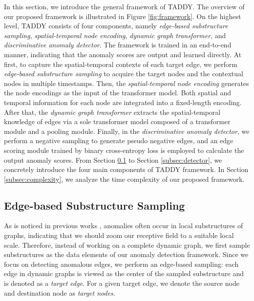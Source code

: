 \documentclass[10pt,journal,compsoc]{IEEEtran}
\newcommand{\HL}{}
\newcommand{\yg}{}
\begin{document}
In this section, we introduce the general framework of TADDY. The overview of our proposed framework is illustrated in Figure \ref{fig:framework}. On the highest level, TADDY consists of four components, namely \textit{edge-based substructure sampling}, \textit{spatial-temporal node encoding}, \textit{dynamic graph transformer}, and \textit{discriminative anomaly detector}. The framework \HL{is trained} in an end-to-end manner, \HL{indicating} that the anomaly scores are output and learned directly.
At first, to capture the spatial-temporal contexts of each target edge, we perform \textit{edge-based substructure sampling} to acquire the target nodes and the contextual nodes in multiple timestamps.
Then, the \textit{spatial-temporal node encoding} generates the node encodings as the input of the transformer model. Both spatial and temporal information for each node are integrated into a fixed-length encoding.
After that, the \textit{dynamic graph transformer} extracts the spatial-temporal knowledge of edges via a sole transformer model composed of a transformer module and a pooling module.
Finally, in the \textit{discriminative anomaly detector}, we perform a negative sampling to generate pseudo negative edges, and an edge scoring module trained by binary cross-entropy loss is employed to calculate the output anomaly scores.
From Section \ref{subsec:sampling} to Section \ref{subsec:detector}, we concretely introduce the four main components of TADDY framework. In Section \ref{subsec:complexity}, we analyze the time complexity of our proposed framework.

\subsection{Edge-based Substructure Sampling} \label{subsec:sampling}

As is noticed in previous works \cite{cai2020structural,liu2021anomaly}, \HL{anomalies} often \HL{occur} in local \HL{substructures} of \HL{graphs}, indicating that we should zoom our \yg{receptive field} to a suitable local scale.
Therefore, instead of working on a complete dynamic graph, we first sample substructures as the data elements of our anomaly detection framework. Since we focus on detecting anomalous edges, we perform an edge-based sampling: each edge in dynamic graphs is viewed as the center of the sampled substructure and is denoted as a \textit{target edge}. For a given target edge, we denote the source node and destination node as \textit{target nodes}.
\end{document}
